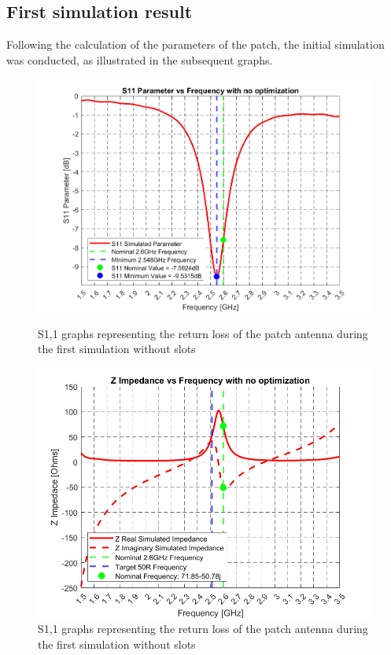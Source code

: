 \documentclass[]{article}
\begin{document}
\subsection{First simulation result}
Following the calculation of the parameters of the patch, the initial simulation was conducted, as illustrated in the subsequent graphs.\\
\begin{figure}[h]
	\centering
	\begin{minipage}{0.4\linewidth}
		\centering
		\includegraphics[width=\linewidth]{img/img7}
		\caption{S1,1 graphs representing the return loss of the patch antenna during the first simulation without slots}
		\label{GSNOslot}
	\end{minipage}\hspace{0.1\linewidth}
	\begin{minipage}{0.4\linewidth}
		\centering
		\includegraphics[width=\linewidth]{img/img8}
		\caption{S1,1 graphs representing the return loss of the patch antenna during the first simulation without slots}
		\label{GZNOslot}
	\end{minipage}
\end{figure}
\end{document}
